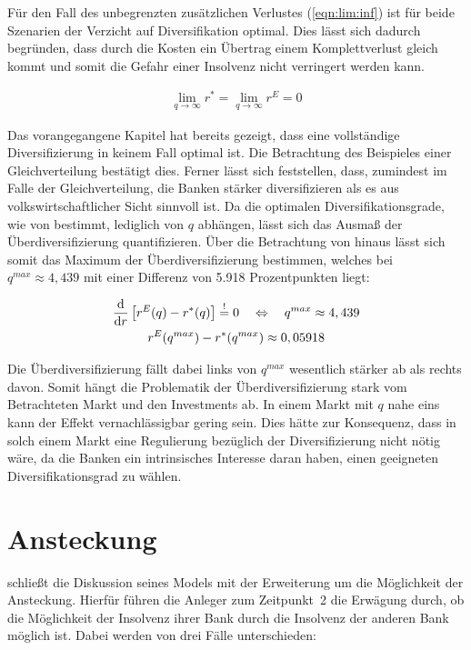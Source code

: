 Für den Fall des unbegrenzten zusätzlichen Verlustes (\cref{eqn:lim:inf}) ist für beide Szenarien der Verzicht auf Diversifikation optimal. Dies lässt sich dadurch begründen, dass durch die Kosten ein Übertrag einem Komplettverlust gleich kommt und somit die Gefahr einer Insolvenz nicht verringert werden kann.

\begin{align}
	\lim_{q\to\infty} r^\ast = \lim_{q\to\infty} r^E = 0 	\label{eqn:lim:inf}
\end{align}

Das vorangegangene Kapitel hat bereits gezeigt, dass eine vollständige Diversifizierung in keinem Fall optimal ist. Die Betrachtung des Beispieles einer Gleichverteilung bestätigt dies. Ferner lässt sich feststellen, dass, zumindest im Falle der Gleichverteilung, die Banken stärker diversifizieren als es aus volkswirtschaftlicher Sicht sinnvoll ist. Da die optimalen Diversifikationsgrade, wie von \citeauthor{Wagner-2010} bestimmt, lediglich von $q$ abhängen, lässt sich das Ausmaß der Überdiversifizierung quantifizieren. Über die Betrachtung von \citeauthor{Wagner-2010} hinaus lässt sich somit das Maximum der Überdiversifizierung bestimmen, welches bei $q^{max} \approx 4,439$ mit einer Differenz von \num{5,918} Prozentpunkten liegt:

\begin{gather}
	\displaystyle \dv{r} \left[ r^E(q) - r^\ast(q) \right] \overset{!}{=} 0 \quad \Leftrightarrow\quad q^{max} \approx 4,439 \\
	r^E(q^{max}) - r^\ast(q^{max}) \approx 0,05918
\end{gather}

Die Überdiversifizierung fällt dabei links von $q^{max}$ wesentlich stärker ab als rechts davon. Somit hängt die Problematik der Überdiversifizierung stark vom Betrachteten Markt und den Investments ab. In einem Markt mit $q$ nahe eins kann der Effekt vernachlässigbar gering sein. Dies hätte zur Konsequenz, dass in solch einem Markt eine Regulierung bezüglich der Diversifizierung nicht nötig wäre, da die Banken ein intrinsisches Interesse daran haben, einen geeigneten Diversifikationsgrad zu wählen.

\section{Ansteckung}

 schließt die Diskussion seines Models mit der Erweiterung um die Möglichkeit der Ansteckung. Hierfür führen die Anleger zum Zeitpunkt~2 die Erwägung durch, ob die Möglichkeit der Insolvenz ihrer Bank durch die Insolvenz der anderen Bank möglich ist. Dabei werden von \citeauthor{Wagner-2010} drei Fälle unterschieden:

